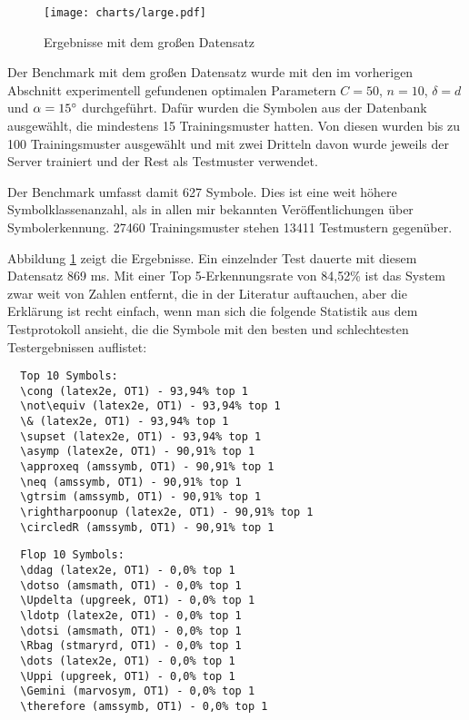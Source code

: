 \begin{figure}[htbp]
  \begin{center}
    \texttt{[image: charts/large.pdf]}
  \end{center}
  \caption{Ergebnisse mit dem großen Datensatz}
  \label{chart:large}
\end{figure}

Der Benchmark mit dem großen Datensatz wurde mit den im vorherigen Abschnitt experimentell gefundenen optimalen Parametern $C=50$, $n=10$, $\delta=d$ und $\alpha=15\degree$ durchgeführt. Dafür wurden die Symbolen aus der Datenbank ausgewählt, die mindestens 15 Trainingsmuster hatten. Von diesen wurden bis zu 100 Trainingsmuster ausgewählt und mit zwei Dritteln davon wurde jeweils der Server trainiert und der Rest als Testmuster verwendet.

Der Benchmark umfasst damit 627 Symbole. Dies ist eine weit höhere Symbolklassenanzahl, als in allen mir bekannten Veröffentlichungen über Symbolerkennung. 27460 Trainingsmuster stehen 13411 Testmustern gegenüber.

Abbildung \ref{chart:large} zeigt die Ergebnisse. Ein einzelnder Test dauerte mit diesem Datensatz 869 ms. Mit einer Top 5-Erkennungsrate von 84,52\% ist das System zwar weit von Zahlen entfernt, die in der Literatur auftauchen, aber die Erklärung ist recht einfach, wenn man sich die folgende Statistik aus dem Testprotokoll ansieht, die die Symbole mit den besten und schlechtesten Testergebnissen auflistet:

\begin{verbatim}
  Top 10 Symbols:
  \cong (latex2e, OT1) - 93,94% top 1
  \not\equiv (latex2e, OT1) - 93,94% top 1
  \& (latex2e, OT1) - 93,94% top 1
  \supset (latex2e, OT1) - 93,94% top 1
  \asymp (latex2e, OT1) - 90,91% top 1
  \approxeq (amssymb, OT1) - 90,91% top 1
  \neq (amssymb, OT1) - 90,91% top 1
  \gtrsim (amssymb, OT1) - 90,91% top 1
  \rightharpoonup (latex2e, OT1) - 90,91% top 1
  \circledR (amssymb, OT1) - 90,91% top 1
\end{verbatim}
  
\begin{verbatim}
  Flop 10 Symbols:
  \ddag (latex2e, OT1) - 0,0% top 1
  \dotso (amsmath, OT1) - 0,0% top 1
  \Updelta (upgreek, OT1) - 0,0% top 1
  \ldotp (latex2e, OT1) - 0,0% top 1
  \dotsi (amsmath, OT1) - 0,0% top 1
  \Rbag (stmaryrd, OT1) - 0,0% top 1
  \dots (latex2e, OT1) - 0,0% top 1
  \Uppi (upgreek, OT1) - 0,0% top 1
  \Gemini (marvosym, OT1) - 0,0% top 1
  \therefore (amssymb, OT1) - 0,0% top 1
\end{verbatim}

